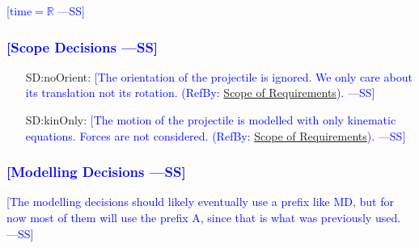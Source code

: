 \documentclass[12pt]{article}
\newcommand{\authornote}[3]{\textcolor{#1}{[#3 ---#2]}}
\newcommand{\authornote}[3]{}
\newcommand{\wss}[1]{\authornote{blue}{SS}{#1}}
\begin{document}
\wss{$\text{time} = \mathbb{R}$} 

\subsubsection{\wss{Scope Decisions}}
\label{Sec:ScopeDec} 

\begin{itemize}
\item[SD:noOrient:\phantomsection\label{SD:noOrient}]{\wss{The orientation of the projectile is ignored. We only care about its translation not its rotation.  (RefBy: \hyperref[Sec:ReqsScope]{Scope of Requirements}).}}
\item[SD:kinOnly:\phantomsection\label{SD:kinOnly}]{\wss{The motion of the
projectile is modelled with only kinematic equations. Forces are not
considered. (RefBy: \hyperref[Sec:ReqsScope]{Scope of Requirements}).}} 
\end{itemize}

\subsubsection{\wss{Modelling Decisions}}
\label{Sec:ModelDec}

\wss{The modelling decisions should likely eventually use a prefix like MD, but
for now most of them will use the prefix A, since that is what was previously
used.}
\end{document}
